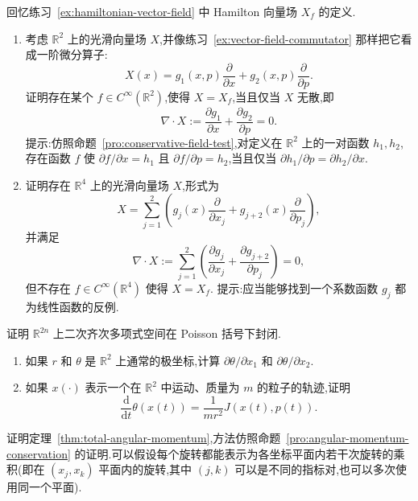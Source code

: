 \begin{exercise}\label{ex:hamiltonian-vector-field-divergence}
回忆练习~\ref{ex:hamiltonian-vector-field} 中 Hamilton 向量场 $X_{f}$ 的定义.
\begin{enumerate}[label=(\alph*)]
  \item 考虑 $\mathbb{R}^{2}$ 上的光滑向量场 $X$,并像练习~\ref{ex:vector-field-commutator} 那样把它看成一阶微分算子:
  \[
    X(x)=g_{1}(x,p)\frac{\partial}{\partial x}
    +g_{2}(x,p)\frac{\partial}{\partial p}.
  \]
  证明存在某个 $f\in C^{\infty}(\mathbb{R}^{2})$,使得 $X=X_{f}$,当且仅当 $X$ 无散,即
  \[
    \nabla\cdot X:=\frac{\partial g_{1}}{\partial x}+\frac{\partial g_{2}}{\partial p}=0.
  \]
  提示:仿照命题~\ref{pro:conservative-field-test},对定义在 $\mathbb{R}^{2}$ 上的一对函数 $h_{1},h_{2}$,存在函数 $f$ 使 $\partial f/\partial x=h_{1}$ 且 $\partial f/\partial p=h_{2}$,当且仅当 $\partial h_{1}/\partial p=\partial h_{2}/\partial x$.
  \item 证明存在 $\mathbb{R}^{4}$ 上的光滑向量场 $X$,形式为
  \[
    X=\sum_{j=1}^{2}\left(g_{j}(x)\frac{\partial}{\partial x_{j}}+g_{j+2}(x)\frac{\partial}{\partial p_{j}}\right),
  \]
  并满足
  \[
    \nabla\cdot X:=\sum_{j=1}^{2}\left(\frac{\partial g_{j}}{\partial x_{j}}+\frac{\partial g_{j+2}}{\partial p_{j}}\right)=0,
  \]
  但不存在 $f\in C^{\infty}(\mathbb{R}^{4})$ 使得 $X=X_{f}$.
  提示:应当能够找到一个系数函数 $g_{j}$ 都为线性函数的反例.
\end{enumerate}
\end{exercise}

\begin{exercise}\label{ex:quadratic-poisson-closure}
证明 $\mathbb{R}^{2n}$ 上二次齐次多项式空间在 Poisson 括号下封闭.
\end{exercise}

\begin{exercise}\label{ex:polar-angular-momentum}
\begin{enumerate}[label=(\alph*)]
  \item 如果 $r$ 和 $\theta$ 是 $\mathbb{R}^{2}$ 上通常的极坐标,计算 $\partial\theta/\partial x_{1}$ 和 $\partial\theta/\partial x_{2}$.
  \item 如果 $x(\cdot)$ 表示一个在 $\mathbb{R}^{2}$ 中运动、质量为 $m$ 的粒子的轨迹,证明
  \[
    \frac{\mathrm{d}}{\mathrm{d}t}\theta(x(t))
    =\frac{1}{mr^{2}}J(x(t),p(t)).
  \]
\end{enumerate}
\end{exercise}

\begin{exercise}\label{ex:prove-total-angular-momentum}
证明定理~\ref{thm:total-angular-momentum},方法仿照命题~\ref{pro:angular-momentum-conservation} 的证明.可以假设每个旋转都能表示为各坐标平面内若干次旋转的乘积(即在 $(x_{j},x_{k})$ 平面内的旋转,其中 $(j,k)$ 可以是不同的指标对,也可以多次使用同一个平面).
\end{exercise}

